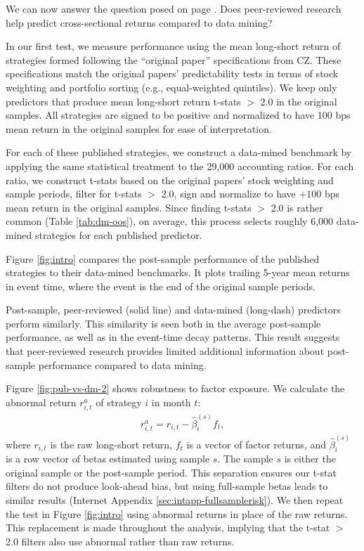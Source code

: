 We can now answer the question posed on page \pageref{sec:intro}. Does peer-reviewed research help predict cross-sectional returns compared to data mining?  

In our first test, we measure performance using the mean long-short return of strategies formed following the ``original paper'' specifications from CZ. These specifications match the original papers' predictability tests in terms of stock weighting and portfolio sorting (e.g., equal-weighted quintiles). We keep only predictors that produce mean long-short return t-stats $>$ 2.0 in the original samples. All strategies are signed to be positive and normalized to have 100 bps mean return in the original samples for ease of interpretation.

For each of these published strategies, we construct a data-mined benchmark by applying the same statistical treatment to the 29,000 accounting ratios. For each ratio, we construct t-stats based on the original papers' stock weighting and sample periods, filter for t-stats $>$ 2.0, sign and normalize to have $+100$ bps mean return in the original samples. Since finding t-stats $>$ 2.0 is rather common (Table \ref{tab:dm-oos}), on average, this process selects roughly 6,000 data-mined strategies for each published predictor. 

Figure \ref{fig:intro} compares the post-sample performance of the published strategies to their data-mined benchmarks. It plots trailing 5-year mean returns in event time, where the event is the end of the original sample periods.  

Post-sample, peer-reviewed (solid line) and data-mined (long-dash) predictors perform similarly. This similarity is seen both in the average post-sample performance, as well as in the event-time decay patterns. This result suggests that peer-reviewed research provides limited additional information about post-sample performance compared to data mining. 

Figure \ref{fig:pub-vs-dm-2} shows robustness to factor exposure. We calculate the abnormal return $r^{a}_{i,t}$ of strategy $i$ in month $t$:
\begin{align}
  r^{a}_{i,t} = r_{i,t}- \hat{\beta}_{i}^{(s)} f_t,
  \label{eq:abnormal_return}
\end{align}
where $r_{i,t}$ is the raw long-short return, $f_t$ is a vector of factor returns, and $\hat{\beta}_{i}^{(s)}$ is a row vector of betas estimated using sample $s$. The sample $s$ is either the original sample or the post-sample period. This separation ensures our t-stat filters do not produce look-ahead bias, but using full-sample betas leads to similar results (Internet Appendix \ref{sec:intapp-fullsamplerisk}). We then repeat the test in Figure \ref{fig:intro} using abnormal returns in place of the raw returns. This replacement is made throughout the analysis, implying that the t-stat $>$ 2.0 filters also use abnormal rather than raw returns.

